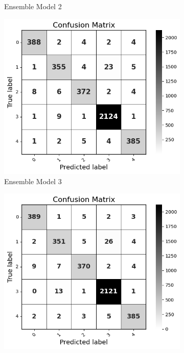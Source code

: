 \begin{figure}[H]
\begin{subfigure}[b]{0.49\textwidth}
        \caption{Ensemble Model 2}
        \label{em2 cm}  %
    \end{subfigure}
    \hfill
    \begin{subfigure}[b]{0.49\textwidth}
        \centering
        \includegraphics[width=\textwidth]{Images/EM3 CM.png}
        \caption{Ensemble Model 3}
        \label{em3 cm}  %
    \end{subfigure}
    \hfill
    \vspace{0.25cm}
    \begin{subfigure}[b]{0.49\textwidth}
        \centering
        \includegraphics[width=\textwidth]{Images/BAG CM.png}

\end{subfigure}
\end{figure}
